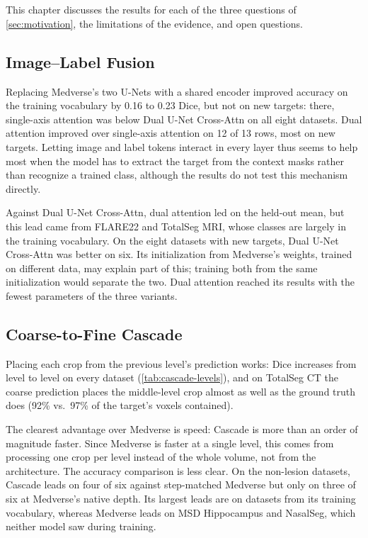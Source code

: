 \documentclass[hidelinks, a4paper, 12pt, ngerman, english]{article}  %
\begin{document}
\section{}\label{sec:discussion}

This chapter discusses the results for each of the three questions of
\autoref{sec:motivation}, the limitations of the evidence, and open questions.

\subsection{Image--Label Fusion}\label{sec:discussion-fusion}

Replacing Medverse's two U-Nets with a shared encoder improved accuracy on the
training vocabulary by 0.16 to 0.23 Dice, but not on new targets: there,
single-axis attention was below Dual U-Net Cross-Attn on all eight datasets.
Dual attention improved over single-axis attention on 12 of 13 rows, most on
new targets. Letting image and label tokens interact in every layer thus seems
to help most when the model has to extract the target from the context masks
rather than recognize a trained class, although the results do not test this
mechanism directly.

Against Dual U-Net Cross-Attn, dual attention led on the held-out mean, but
this lead came from FLARE22 and TotalSeg MRI, whose classes are largely in the
training vocabulary. On the eight datasets with new targets, Dual U-Net
Cross-Attn was better on six. Its initialization from Medverse's weights,
trained on different data, may explain part of this; training both from the
same initialization would separate the two. Dual attention reached its results
with the fewest parameters of the three variants.

\subsection{Coarse-to-Fine Cascade}\label{sec:discussion-cascade}

Placing each crop from the previous level's prediction works: Dice increases
from level to level on every dataset (\autoref{tab:cascade-levels}), and on
TotalSeg CT the coarse prediction places the middle-level crop almost as well
as the ground truth does (92\% vs.\ 97\% of the target's voxels contained).

The clearest advantage over Medverse is speed: Cascade is more than an order
of magnitude faster. Since Medverse is faster at a single level, this comes
from processing one crop per level instead of the whole volume, not from the
architecture. The accuracy comparison is less clear. On the non-lesion datasets, Cascade leads on four of six against step-matched
Medverse but only on three of six at Medverse's native depth. Its largest
leads are on datasets from its training vocabulary, whereas Medverse leads on
MSD Hippocampus and NasalSeg, which neither model saw during training.
\end{document}
